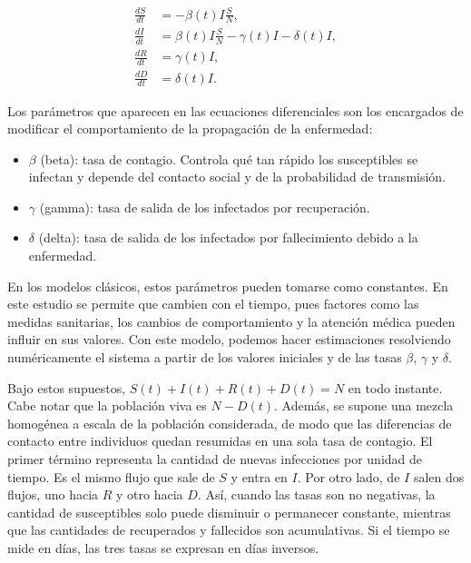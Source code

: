 \begin{equation}
\label{eq:sird}
\begin{aligned}
    \frac{dS}{dt} &= -\beta(t) I \frac{S}{N}, \\
    \frac{dI}{dt} &= \beta(t) I \frac{S}{N} - \gamma(t) I - \delta(t) I, \\
    \frac{dR}{dt} &= \gamma(t) I, \\
    \frac{dD}{dt} &= \delta(t) I.
\end{aligned}
\end{equation}

Los parámetros que aparecen en las ecuaciones diferenciales son los encargados de modificar el comportamiento de la propagación de la enfermedad:

\begin{itemize}
    \item $\beta$ (beta): tasa de contagio. Controla qué tan rápido los susceptibles se infectan y depende del contacto social y de la probabilidad de transmisión.

    \item $\gamma$ (gamma): tasa de salida de los infectados por recuperación.
    \item $\delta$ (delta): tasa de salida de los infectados por fallecimiento debido a la enfermedad.
\end{itemize}

En los modelos clásicos, estos parámetros pueden tomarse como constantes. En este estudio se permite que cambien con el tiempo, pues factores como las medidas sanitarias, los cambios de comportamiento y la atención médica pueden influir en sus valores. Con este modelo, podemos hacer estimaciones resolviendo numéricamente el sistema a partir de los valores iniciales y de las tasas $\beta$, $\gamma$ y $\delta$.

Bajo estos supuestos, $S(t)+I(t)+R(t)+D(t)=N$ en todo instante. Cabe notar que la población viva es $N-D(t)$. Además, se supone una mezcla homogénea a escala de la población considerada, de modo que las diferencias de contacto entre individuos quedan resumidas en una sola tasa de contagio.
El primer término representa la cantidad de nuevas infecciones por unidad de tiempo. Es el mismo flujo que sale de $S$ y entra en $I$. Por otro lado, de $I$ salen dos flujos, uno hacia $R$ y otro hacia $D$. Así, cuando las tasas son no negativas, la cantidad de susceptibles solo puede disminuir o permanecer constante, mientras que las cantidades de recuperados y fallecidos son acumulativas. Si el tiempo se mide en días, las tres tasas se expresan en días inversos.


